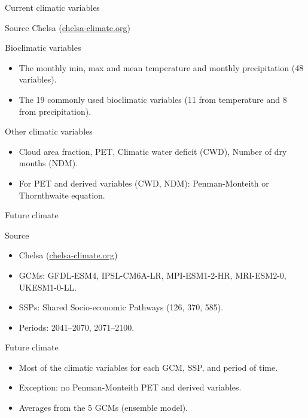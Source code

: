 \documentclass[10pt,table,dvipsnames,compress]{beamer}
\begin{document}
\begin{frame}[label={sec:org24570ac}]{Current climatic variables}
\begin{block}{Source}
Chelsa (\href{https://chelsa-climate.org)}{chelsa-climate.org})
\end{block}

\begin{block}{Bioclimatic variables}
\begin{itemize}
\item The monthly min, max and mean temperature and monthly precipitation (48 variables).
\item The 19 commonly used bioclimatic variables (11 from temperature and 8 from precipitation).
\end{itemize}
\end{block}

\begin{block}{Other climatic variables}
\begin{itemize}
\item Cloud area fraction, PET, Climatic water deficit (CWD), Number of dry months (NDM).
\item For PET and derived variables (CWD, NDM): Penman-Monteith or Thornthwaite equation.
\end{itemize}
\end{block}
\end{frame}

\begin{frame}[label={sec:org76bed84}]{Future climate}
\begin{block}{Source}
\begin{itemize}
\item Chelsa (\href{https://chelsa-climate.org)}{chelsa-climate.org})
\item GCMs: GFDL-ESM4, IPSL-CM6A-LR, MPI-ESM1-2-HR, MRI-ESM2-0, UKESM1-0-LL.
\item SSPs: Shared Socio-economic Pathways (126, 370, 585).
\item Periods: 2041--2070, 2071--2100.
\end{itemize}
\end{block}

\begin{block}{Future climate}
\begin{itemize}
\item Most of the climatic variables for each GCM, SSP, and period of time.
\item Exception: no Penman-Monteith PET and derived variables.
\item Averages from the 5 GCMs (ensemble model).
\end{itemize}
\end{block}
\end{frame}
\end{document}
